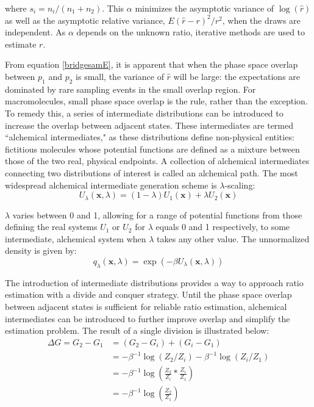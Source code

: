 \noindent where $s_i=n_i/(n_1+n_2)$. This $\alpha$ minimizes the asymptotic variance of $\log(\hat{r})$ as well as the asymptotic relative variance, $E(\hat{r}-r)^2/r^2$, when the draws are independent\cite{meng2002warp}. As $\alpha$ depends on the unknown ratio, iterative methods are used to estimate $r$\cite{meng1996simulating}.

From equation \eqref{bridgesamE}, it is apparent that when the phase space overlap between $p_1$ and $p_2$ is small, the variance of $\hat{r}$ will be large: the expectations are dominated by rare sampling events in the small overlap region. For macromolecules, small phase space overlap is the rule, rather than the exception\cite{wu2005phase1,wu2005phase2}. To remedy this, a series of intermediate distributions can be introduced to increase the overlap between adjacent states\cite{shirts2007alchemical}. These intermediates are termed ``alchemical intermediates," as these distributions define non-physical entities: fictitious molecules whose potential functions are defined as a mixture between those of the two real, physical endpoints. A collection of alchemical intermediates connecting two distributions of interest is called an alchemical path. The most widespread alchemical intermediate generation scheme is $\lambda$-scaling\cite{shirts2007alchemical,christ2010basic}:
\begin{equation} \label{lambdascaling}
U_{\lambda}(\boldsymbol{x}, \lambda)= (1-\lambda) U_1(\boldsymbol{x}) + \lambda U_2(\boldsymbol{x})
\end{equation}

\noindent $\lambda$ varies between 0 and 1, allowing for a range of potential functions from those defining the real systems $U_1$ or $U_2$ for $\lambda$ equals 0 and 1 respectively, to some intermediate, alchemical system when $\lambda$ takes any other value. The unnormalized density is given by:
\begin{equation}
q_\lambda(\boldsymbol{x}, \lambda) = \exp(-\beta U_\lambda(\boldsymbol{x}, \lambda))
\end{equation}

\noindent The introduction of intermediate distributions provides a way to approach ratio estimation with a divide and conquer strategy. Until the phase space overlap between adjacent states is sufficient for reliable ratio estimation, alchemical intermediates can be introduced to further improve overlap and simplify the estimation problem. The result of a single division is illustrated below:
\begin{equation} \label{tbar}
\begin{split}
\Delta G = G_2-G_1 &= (G_2-G_i) + (G_i-G_1) \\
 &= -\beta^{-1}\log(Z_2/Z_i) -\beta^{-1}\log(Z_i/Z_1) \\
 &= -\beta^{-1} \log\left(\frac{Z_2}{Z_i} * \frac{Z_i}{Z_1}\right) \\
 &= -\beta^{-1} \log\left(\frac{Z_2}{Z_1}\right)
\end{split}
\end{equation}


